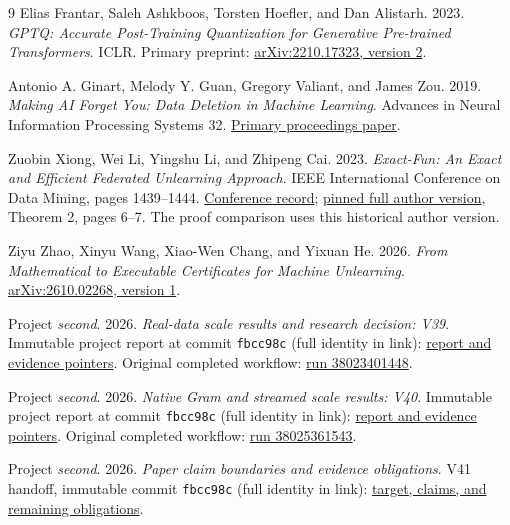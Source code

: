 \documentclass[10pt,twocolumn,letterpaper]{article}
\begin{document}
\begin{thebibliography}{9}
Elias Frantar, Saleh Ashkboos, Torsten Hoefler, and Dan Alistarh.
2023. \emph{GPTQ: Accurate Post-Training Quantization for Generative Pre-trained
Transformers}. ICLR. Primary preprint:
\href{https://arxiv.org/abs/2210.17323v2}{arXiv:2210.17323, version 2}.

Antonio A. Ginart, Melody Y. Guan, Gregory Valiant, and James Zou.
2019. \emph{Making AI Forget You: Data Deletion in Machine Learning}.
Advances in Neural Information Processing Systems 32.
\href{https://papers.nips.cc/paper_files/paper/2019/file/cb79f8fa58b91d3af6c9c991f63962d3-Paper.pdf}{Primary proceedings paper}.

Zuobin Xiong, Wei Li, Yingshu Li, and Zhipeng Cai.
2023. \emph{Exact-Fun: An Exact and Efficient Federated Unlearning Approach}.
IEEE International Conference on Data Mining, pages 1439--1444.
\href{https://doi.org/10.1109/ICDM58522.2023.00188}{Conference record};
\href{https://github.com/zuobinxiong/zuobinxiong.github.io/blob/300a0672be8d265ddebf20d6e69f790456a1bd81/assets/pdf/ExactFedUnlearning.pdf}{pinned full author version},
Theorem 2, pages 6--7. The proof comparison uses this historical author version.

Ziyu Zhao, Xinyu Wang, Xiao-Wen Chang, and Yixuan He.
2026. \emph{From Mathematical to Executable Certificates for Machine Unlearning}.
\href{https://arxiv.org/html/2610.02268v1}{arXiv:2610.02268, version 1}.

Project \emph{second}. 2026. \emph{Real-data scale results and research decision:
V39}. Immutable project report at commit
\texttt{fbcc98c} (full identity in link):
\href{https://github.com/priyankjairaj100/second/blob/fbcc98c6559de4b88ffc9c8b960cf680d89e29d3/docs/SCALE_RESULTS_V39.md}{report and evidence pointers}.
Original completed workflow:
\href{https://github.com/priyankjairaj100/second/actions/runs/38023401448}{run 38023401448}.

Project \emph{second}. 2026. \emph{Native Gram and streamed scale results: V40}.
Immutable project report at commit
\texttt{fbcc98c} (full identity in link):
\href{https://github.com/priyankjairaj100/second/blob/fbcc98c6559de4b88ffc9c8b960cf680d89e29d3/docs/NATIVE_SCALE_RESULTS_V40.md}{report and evidence pointers}.
Original completed workflow:
\href{https://github.com/priyankjairaj100/second/actions/runs/38025361543}{run 38025361543}.

Project \emph{second}. 2026. \emph{Paper claim boundaries and evidence obligations}.
V41 handoff, immutable commit
\texttt{fbcc98c} (full identity in link):
\href{https://github.com/priyankjairaj100/second/blob/fbcc98c6559de4b88ffc9c8b960cf680d89e29d3/docs/CLAIM_BOUNDARIES_V41.md}{target, claims, and remaining obligations}.


\end{thebibliography}
\end{document}
